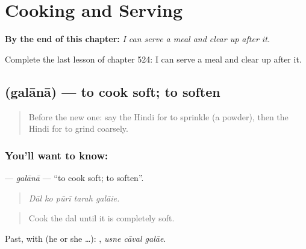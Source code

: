 
\chapter{Cooking and Serving}
\label{ch:hi-cooking-and-serving}

\begin{chapteropening}
\textbf{By the end of this chapter:} \emph{I can serve a meal and clear up after it.}

Complete the last lesson of chapter 524: I can serve a meal and clear up after it.
\end{chapteropening}

\section[\texorpdfstring{\hi{गलाना} (galānā)}{गलाना (galānā)}]{ (galānā) — to cook soft; to soften}

\label{lesson:HI-C524-galana}



\begin{quote}
Before the new one: say the Hindi for to sprinkle (a powder), then the Hindi for to grind coarsely.
\end{quote}

\subsection*{You'll want to know: }
\textbf{} — \emph{galānā} — \textquotedblleft{}to cook soft; to soften\textquotedblright{}.

\begin{quote}
    
\end{quote}

\begin{quote}
\emph{Dāl ko pūrī tarah galāie.}
\end{quote}

\begin{quote}
Cook the dal until it is completely soft.
\end{quote}

Past, with  (he or she …):   , \emph{usne cāval galāe}.

